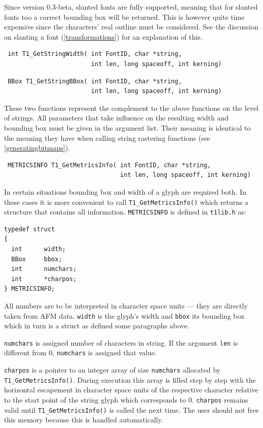 Since version 0.3-beta, slanted fonts are fully supported, meaning that for
slanted fonts too a correct bounding box will be returned. This is however
quite time expensive since the characters' real outline must be considered.
See the discussion on slanting a font  (\ref{transformations}) for an
explanation of this.


\precorr
\begin{verbatim}
 int T1_GetStringWidth( int FontID, char *string,
                        int len, long spaceoff, int kerning)
\end{verbatim}\postcorr
\precorr
\begin{verbatim}
 BBox T1_GetStringBBox( int FontID, char *string,
                        int len, long spaceoff, int kerning)
\end{verbatim}\postcorr
These two functions represent the complement to the above functions on the level
of strings. All parameters that take influence on the resulting width and
bounding box must be given in the argument list. Their meaning is identical to
the meaning they have when calling string rastering functions (see
\ref{generatingbitmaps}). 


\precorr
\begin{verbatim}
 METRICSINFO T1_GetMetricsInfo( int FontID, char *string,
                                int len, long spaceoff, int kerning)
\end{verbatim}\postcorr
In certain situations bounding box and width of a glyph are required both. In
these cases it is more convenient to call \verb+T1_GetMetricsInfo()+ which
returns a structure that contains all information. \verb+METRICSINFO+ is
defined in \verb+t1lib.h+ as:
\begin{verbatim}
typedef struct
{
  int      width;
  BBox     bbox;
  int      numchars;
  int      *charpos;
} METRICSINFO;
\end{verbatim}
All numbers are to be interpreted in character space units --- they are
directly taken from AFM data. \verb+width+ is the glyph's width and
\verb+bbox+ its bounding box which in turn is a struct as defined some
paragraphs above.

\verb+numchars+ is assigned number of characters in string. If the argument
\verb+len+ is different from 0, \verb+numchars+ is assigned that value.

\verb+charpos+ is a pointer to an integer array of size \verb+numchars+
allocated by \verb+T1_GetMetricsInfo()+. During execution this array is filled
step by step with the horizontal escapement in character space units of the
respective character relative to the start point of the string glyph which
corresponds to 0. \verb+charpos+ remains valid until
\verb+T1_GetMetricsInfo()+ is called the next time. The user should not
free this memory because this is handled automatically.

